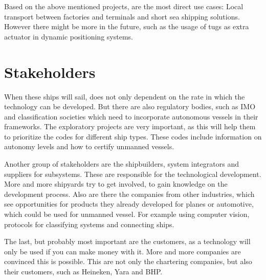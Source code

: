 Based on the above mentioned projects, are the most direct use cases: Local transport between factories and terminals and short sea shipping solutions. However there might be more in the future, such as the usage of tugs as extra actuator in dynamic positioning systems.

\section{Stakeholders}
When these ships will sail, does not only dependent on the rate in which the technology can be developed. But there are also regulatory bodies, such as \ac{IMO} and classification societies which need to incorporate autonomous vessels in their frameworks. 
The exploratory projects are very important, as this will help them to prioritize the codes for different ship types. These codes include information on autonomy levels and how to certify unmanned vessels.

Another group of stakeholders are the shipbuilders, system integrators and suppliers for subsystems. These are responsible for the technological development. More and more shipyards try to get involved, to gain knowledge on the development process. 
Also are there the companies from other industries, which see opportunities for products they already developed for planes or automotive, which could be used for unmanned vessel. For example using computer vision, protocols for classifying systems and connecting ships.

The last, but probably most important are the customers, as a technology will only be used if you can make money with it. More and more companies are convinced this is possible. This are not only the chartering companies, but also their customers, such as Heineken, Yara and BHP.

